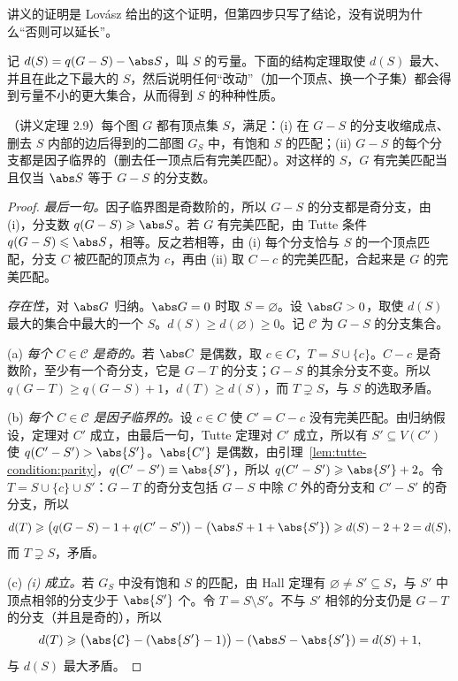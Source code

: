 讲义的证明是 Lovász 给出的这个证明，但第四步只写了结论，没有说明为什么“否则可以延长”。


记 $d(S)=q(G-S)-\abs S$，叫 $S$ 的亏量。下面的结构定理取使 $d(S)$ 最大、并且在此之下最大的 $S$，然后说明任何“改动”（加一个顶点、换一个子集）都会得到亏量不小的更大集合，从而得到 $S$ 的种种性质。

\begin{theorem}\label{thm:tutte-condition:gallai-edmonds}
（讲义定理 2.9）每个图 $G$ 都有顶点集 $S$，满足：(i) 在 $G-S$ 的分支收缩成点、删去 $S$ 内部的边后得到的二部图 $G_S$ 中，有饱和 $S$ 的匹配；(ii) $G-S$ 的每个分支都是因子临界的（删去任一顶点后有完美匹配）。对这样的 $S$，$G$ 有完美匹配当且仅当 $\abs S$ 等于 $G-S$ 的分支数。
\end{theorem}
\begin{proof}
\emph{最后一句。}因子临界图是奇数阶的，所以 $G-S$ 的分支都是奇分支，由 (i)，分支数 $q(G-S)\geqslant\abs S$。若 $G$ 有完美匹配，由 Tutte 条件 $q(G-S)\leqslant\abs S$，相等。反之若相等，由 (i) 每个分支恰与 $S$ 的一个顶点匹配，分支 $C$ 被匹配的顶点为 $c$，再由 (ii) 取 $C-c$ 的完美匹配，合起来是 $G$ 的完美匹配。

\emph{存在性}，对 $\abs G$ 归纳。$\abs G=0$ 时取 $S=\varnothing$。设 $\abs G>0$，取使 $d(S)$ 最大的集合中最大的一个 $S$。$d(S)\geqslant d(\varnothing)\geqslant0$。记 $\mathcal C$ 为 $G-S$ 的分支集合。

(a) \emph{每个 $C\in\mathcal C$ 是奇的。}若 $\abs C$ 是偶数，取 $c\in C$，$T=S\cup\{c\}$。$C-c$ 是奇数阶，至少有一个奇分支，它是 $G-T$ 的分支；$G-S$ 的其余分支不变。所以 $q(G-T)\geqslant q(G-S)+1$，$d(T)\geqslant d(S)$，而 $T\supsetneq S$，与 $S$ 的选取矛盾。

(b) \emph{每个 $C\in\mathcal C$ 是因子临界的。}设 $c\in C$ 使 $C'=C-c$ 没有完美匹配。由归纳假设，定理对 $C'$ 成立，由最后一句，Tutte 定理对 $C'$ 成立，所以有 $S'\subseteq V(C')$ 使 $q(C'-S')>\abs{S'}$。$\abs{C'}$ 是偶数，由引理~\ref{lem:tutte-condition:parity}，$q(C'-S')\equiv\abs{S'}$，所以 $q(C'-S')\geqslant\abs{S'}+2$。令 $T=S\cup\{c\}\cup S'$：$G-T$ 的奇分支包括 $G-S$ 中除 $C$ 外的奇分支和 $C'-S'$ 的奇分支，所以
\[
d(T)\geqslant\bigl(q(G-S)-1+q(C'-S')\bigr)-\bigl(\abs S+1+\abs{S'}\bigr)\geqslant d(S)-2+2=d(S),
\]
而 $T\supsetneq S$，矛盾。

(c) \emph{(i) 成立。}若 $G_S$ 中没有饱和 $S$ 的匹配，由 Hall 定理有 $\varnothing\neq S'\subseteq S$，与 $S'$ 中顶点相邻的分支少于 $\abs{S'}$ 个。令 $T=S\setminus S'$。不与 $S'$ 相邻的分支仍是 $G-T$ 的分支（并且是奇的），所以
\[
d(T)\geqslant\bigl(\abs{\mathcal C}-(\abs{S'}-1)\bigr)-(\abs S-\abs{S'})=d(S)+1,
\]
与 $d(S)$ 最大矛盾。
\end{proof}

